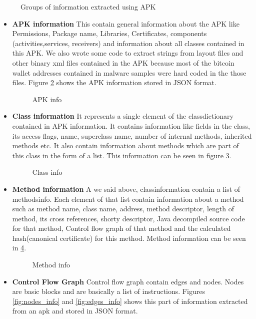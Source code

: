 \documentclass[../main.tex]{subfile}
\begin{document}
		\begin{figure}[h]
			\centering
			\caption{Groups of information extracted using APK}
			\label{fig:info_extracted}
		\end{figure}
		
		
		\begin{itemize}
			\item \textbf{APK information} This contain general information about the APK like Permissions, Package name, Libraries, Certificates, components (activities,services, receivers) and information about all classes contained in this APK. We also wrote some code to extract strings from layout files and other binary xml files contained in the APK because most of the bitcoin wallet addresses contained in malware samples were hard coded in the those files. Figure \ref{fig:apk_info} shows the APK information stored in JSON format.
			\begin{figure}[h]
				\centering
				\caption{APK info}
				\label{fig:apk_info}	
			\end{figure}
			
			\item \textbf{Class information} It represents a single element of the class\textunderscore dictionary contained in APK information. It contains information like fields in the class, its access flags, name, superclass name, number of internal methods, inherited methods etc. It also contain information about methods which are part of this class in the form of a list. This information can be seen in figure \ref{fig:class_info}.
			\begin{figure}[h]
				\centering
				\caption{Class info}
				\label{fig:class_info}	
			\end{figure}
			
			
			\item \textbf{Method information} A we said above, class\textunderscore information contain a list of methods\textunderscore info. Each element of that list contain information about a method such as method name, class name, address, method descriptor, length of method, its cross references, shorty descriptor, Java decompiled source code for that method, Control flow graph of that method and the calculated hash(canonical certificate) for this method. Method information can be seen in \ref{fig:method_info}.
			\begin{figure}
				\centering
				\caption{Method info}
				\label{fig:method_info}	
			\end{figure}
			\item \textbf{Control Flow Graph} Control flow graph contain edges and nodes. Nodes are basic blocks and are basically a list of instructions. Figures \ref{fig:nodes_info} and \ref{fig:edges_info} shows this part of information extracted from an apk and stored in JSON format.


\end{itemize}
\end{document}
